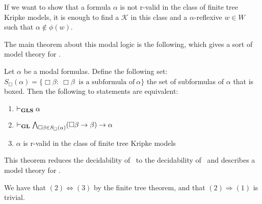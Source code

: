 \documentclass[../main.tex]{subfiles}
\begin{document}
If we want to show that a formula $\alpha$ is not r-valid in the class of
finite tree Kripke models, it is enough to find a $\mathcal{K}$ in this class
and a $\alpha$-reflexive $w\in W$ such that $\alpha\not\in\phi(w)$.

The main theorem about this modal logic is the following, which gives a sort of
model theory for \GLS. 

\begin{thm}
	\label{thm:MainGLS}
	Let $\alpha$ be a modal formulas. Define the following set: $S_\Box(\alpha)=\{\Box\beta:\
	\Box\beta\ \text{ is a subformula of}\ \alpha\}$ the set of
	subformulas of $\alpha$ that is boxed. Then the following to
	statements are equivalent:
	\begin{enumerate}
		\item $\vdash_{\text{\textbf{GLS}}}\alpha$
		\item $\vdash_{\text{\textbf{GL}}}\bigwedge_{\Box\beta\in
			S_\Box(\alpha)}(\Box\beta\rightarrow\beta)\rightarrow\alpha$
		\item $\alpha$ is r-valid in the class of finite tree Kripke
			models
	\end{enumerate}
\end{thm}
This theorem reduces the decidability of \GLS\ to the decidability of \GL\ and
describes a model theory for \GLS.

	We have that $(2)\Leftrightarrow(3)$ by the finite tree theorem, and
	that $(2)\Rightarrow(1)$ is trivial.
\end{document}
